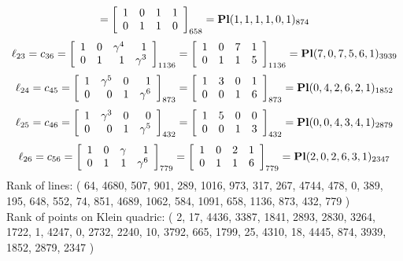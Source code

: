 \documentclass{article}
\begin{document}
{$$=
\left[
\begin{array}{*{4}c}
1  & 0  & 1  & 1\\
0  & 1  & 1  & 0\\
\end{array}
\right]_{658}
={\rm\bf Pl}(1,1,1,1,0,1 )_{874}$$
$$
\ell_{23} = c_{36} = 
\left[
\begin{array}{*{4}{r}}
1 & 0 & \gamma^{4} & 1\\
0 & 1 & 1 & \gamma^{3}\\
\end{array}
\right]
_{1136}
=
\left[
\begin{array}{*{4}c}
1  & 0  & 7  & 1\\
0  & 1  & 1  & 5\\
\end{array}
\right]_{1136}
={\rm\bf Pl}(7,0,7,5,6,1 )_{3939}$$
$$
\ell_{24} = c_{45} = 
\left[
\begin{array}{*{4}{r}}
1 & \gamma^{5} & 0 & 1\\
0 & 0 & 1 & \gamma^{6}\\
\end{array}
\right]
_{873}
=
\left[
\begin{array}{*{4}c}
1  & 3  & 0  & 1\\
0  & 0  & 1  & 6\\
\end{array}
\right]_{873}
={\rm\bf Pl}(0,4,2,6,2,1 )_{1852}$$
$$
\ell_{25} = c_{46} = 
\left[
\begin{array}{*{4}{r}}
1 & \gamma^{3} & 0 & 0\\
0 & 0 & 1 & \gamma^{5}\\
\end{array}
\right]
_{432}
=
\left[
\begin{array}{*{4}c}
1  & 5  & 0  & 0\\
0  & 0  & 1  & 3\\
\end{array}
\right]_{432}
={\rm\bf Pl}(0,0,4,3,4,1 )_{2879}$$
$$
\ell_{26} = c_{56} = 
\left[
\begin{array}{*{4}{r}}
1 & 0 & \gamma  & 1\\
0 & 1 & 1 & \gamma^{6}\\
\end{array}
\right]
_{779}
=
\left[
\begin{array}{*{4}c}
1  & 0  & 2  & 1\\
0  & 1  & 1  & 6\\
\end{array}
\right]_{779}
={\rm\bf Pl}(2,0,2,6,3,1 )_{2347}$$
Rank of lines: ( 64, 4680, 507, 901, 289, 1016, 973, 317, 267, 4744, 478, 0, 389, 195, 648, 552, 74, 851, 4689, 1062, 584, 1091, 658, 1136, 873, 432, 779 )\\
Rank of points on Klein quadric: ( 2, 17, 4436, 3387, 1841, 2893, 2830, 3264, 1722, 1, 4247, 0, 2732, 2240, 10, 3792, 665, 1799, 25, 4310, 18, 4445, 874, 3939, 1852, 2879, 2347 )\\
}
\end{document}
